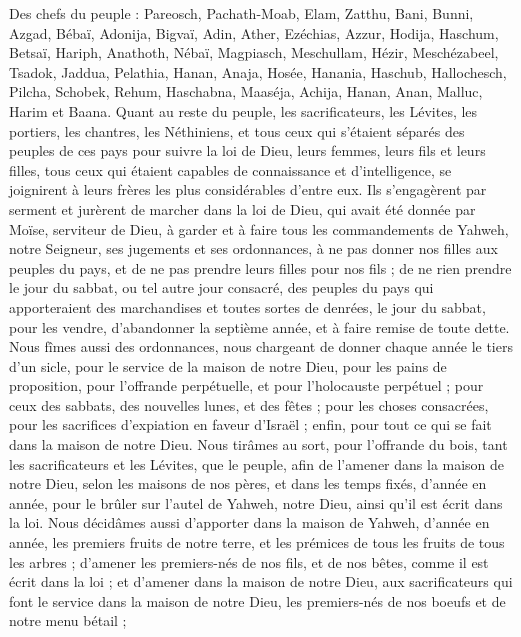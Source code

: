 \begin{multicols}{2}
Des chefs du peuple : Pareosch, Pachath-Moab, Elam, Zatthu, Bani,
Bunni, Azgad, Bébaï,
Adonija, Bigvaï, Adin,
Ather, Ezéchias, Azzur,
Hodija, Haschum, Betsaï,
Hariph, Anathoth, Nébaï,
Magpiasch, Meschullam, Hézir,
Meschézabeel, Tsadok, Jaddua,
Pelathia, Hanan, Anaja,
Hosée, Hanania, Haschub,
Hallochesch, Pilcha, Schobek,
Rehum, Haschabna, Maaséja,
Achija, Hanan, Anan,
Malluc, Harim et Baana.
Quant au reste du peuple, les sacrificateurs, les Lévites, les portiers, les chantres, les Néthiniens, et tous ceux qui s'étaient séparés des peuples de ces pays pour suivre la loi de Dieu, leurs femmes, leurs fils et leurs filles, tous ceux qui étaient capables de connaissance et d'intelligence,
se joignirent à leurs frères les plus considérables d'entre eux. Ils s'engagèrent par serment et jurèrent de marcher dans la loi de Dieu, qui avait été donnée par Moïse, serviteur de Dieu, à garder et à faire tous les commandements de Yahweh, notre Seigneur, ses jugements et ses ordonnances,
à ne pas donner nos filles aux peuples du pays, et de ne  pas prendre leurs filles pour nos fils ;
de ne rien prendre le jour du sabbat, ou tel autre jour consacré, des peuples du pays qui apporteraient des marchandises et toutes sortes de denrées, le jour du sabbat, pour les vendre, d'abandonner la septième année, et à faire remise de toute dette.
Nous fîmes aussi des ordonnances, nous chargeant de donner chaque année le tiers d'un sicle, pour le service de la maison de notre Dieu,
pour les pains de proposition, pour l’offrande perpétuelle, et pour l'holocauste perpétuel ; pour ceux des sabbats, des nouvelles lunes, et des fêtes ; pour les choses consacrées,  pour les sacrifices d'expiation en faveur d’Israël ; enfin, pour tout ce qui se fait dans la maison de notre Dieu.
Nous tirâmes au sort, pour l'offrande du bois, tant les sacrificateurs et les Lévites, que le peuple, afin de l'amener dans la maison de notre Dieu, selon les maisons de nos pères, et dans les temps fixés, d'année en année, pour le brûler sur l'autel de Yahweh, notre Dieu, ainsi qu'il est écrit dans la loi.
Nous décidâmes aussi d'apporter dans la maison de Yahweh, d'année en année, les premiers fruits de notre terre, et les prémices de tous les fruits de tous les arbres ;
d’amener les premiers-nés de nos fils, et de nos bêtes, comme il est écrit dans la loi ; et d’amener dans la maison de notre Dieu, aux sacrificateurs qui font le service dans la maison de notre Dieu, les premiers-nés de nos boeufs et de notre menu bétail ;

\end{multicols}
